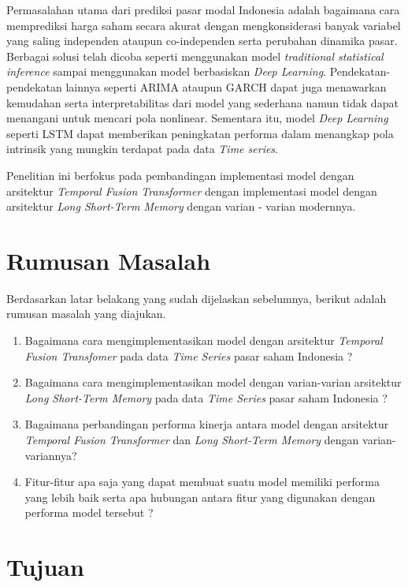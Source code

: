 Permasalahan utama dari prediksi pasar modal Indonesia adalah bagaimana cara memprediksi harga saham secara akurat dengan mengkonsiderasi banyak variabel yang saling independen ataupun co-independen serta perubahan dinamika pasar. Berbagai solusi telah dicoba seperti menggunakan model \textit{traditional statistical inference} sampai menggunakan model berbasiskan \textit{Deep Learning}. Pendekatan-pendekatan lainnya seperti ARIMA ataupun GARCH dapat juga menawarkan kemudahan serta interpretabilitas dari model yang sederhana namun tidak dapat menangani untuk mencari pola nonlinear. Sementara itu, model \textit{Deep Learning} seperti LSTM dapat memberikan peningkatan performa dalam menangkap pola intrinsik yang mungkin terdapat pada data \textit{Time series}.

Penelitian ini berfokus pada pembandingan implementasi model dengan arsitektur \textit{Temporal Fusion Transformer} dengan implementasi model dengan arsitektur \textit{Long Short-Term Memory} dengan varian - varian modernnya. 


\section{Rumusan Masalah}

Berdasarkan latar belakang yang sudah dijelaskan sebelumnya, berikut adalah rumusan masalah yang diajukan.

\begin{enumerate}
    \item Bagaimana cara mengimplementasikan model dengan arsitektur \textit{Temporal Fusion Transfomer} pada data \textit{Time Series} pasar saham Indonesia ?
    \item Bagaimana cara mengimplementasikan model dengan varian-varian arsitektur \textit{Long Short-Term Memory} pada data \textit{Time Series} pasar saham Indonesia ?
    \item Bagaimana perbandingan performa kinerja antara model dengan arsitektur \textit{Temporal Fusion Transformer} dan \textit{Long Short-Term Memory} dengan varian-variannya?
    \item Fitur-fitur apa saja yang dapat membuat suatu model memiliki performa yang lebih baik serta apa hubungan antara fitur yang digunakan dengan performa model tersebut ?
\end{enumerate}

\section{Tujuan}


